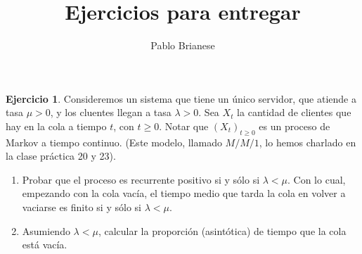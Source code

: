 \documentclass{article}
\title{Ejercicios para entregar}
\author{Pablo Brianese}
\theoremstyle{definition}
\newtheorem{exercise}{Ejercicio}
\begin{document}
\maketitle

\begin{exercise}
Consideremos un sistema que tiene un único servidor, que atiende a tasa $\mu > 0$, y los cluentes llegan a tasa $\lambda > 0$.
Sea $X_t$ la cantidad de clientes que hay en la cola a tiempo $t$, con $t \geq 0$.
Notar que $(X_t)_{t \geq 0}$ es un proceso de Markov a tiempo continuo.
(Este modelo, llamado $M/ M / 1$, lo hemos charlado en la clase práctica 20 y 23).
\begin{enumerate}[label=\alph*)]
    \item Probar que el proceso es recurrente positivo si y sólo si $\lambda < \mu$.
	Con lo cual, empezando con la cola vacía, el tiempo medio que tarda la cola en volver a vaciarse es finito si y sólo si $\lambda < \mu$.
	\item Asumiendo $\lambda < \mu$, calcular la proporción (asintótica) de tiempo que la cola está vacía.
\end{enumerate}
\end{exercise}
\end{document}
